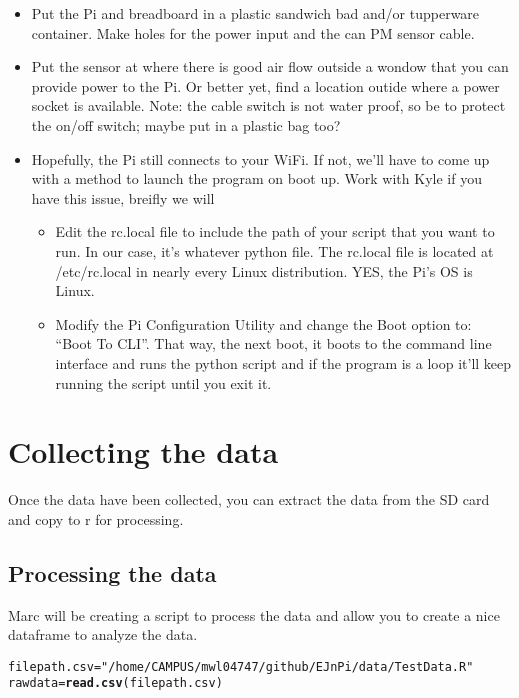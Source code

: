 \documentclass{article}\usepackage[]{graphicx}\usepackage[]{color}
\makeatletter
\newcommand{\hlstr}[1]{\textcolor[rgb]{0.192,0.494,0.8}{#1}}%
\newcommand{\hlstd}[1]{\textcolor[rgb]{0.345,0.345,0.345}{#1}}%
\newcommand{\hlkwb}[1]{\textcolor[rgb]{0.69,0.353,0.396}{#1}}%
\newcommand{\hlkwd}[1]{\textcolor[rgb]{0.737,0.353,0.396}{\textbf{#1}}}%
\newenvironment{kframe}{%
 \def\at@end@of@kframe{}%
 \ifinner\ifhmode%
  \def\at@end@of@kframe{\end{minipage}}%
  \begin{minipage}{\columnwidth}%
 \fi\fi%
 \def\FrameCommand##1{\hskip\@totalleftmargin \hskip-\fboxsep
 \colorbox{shadecolor}{##1}\hskip-\fboxsep
     \hskip-\linewidth \hskip-\@totalleftmargin \hskip\columnwidth}%
 \MakeFramed {\advance\hsize-\width
   \@totalleftmargin\z@ \linewidth\hsize
   \@setminipage}}%
 {\par\unskip\endMakeFramed%
 \at@end@of@kframe}
\newenvironment{knitrout}{}{} %
\makeatother
\begin{document}
\begin{itemize}
  \item Put the Pi and breadboard in a plastic sandwich bad and/or tupperware container. Make holes for the power input and the can PM sensor cable. 
  \item Put the sensor at where there is good air flow outside a wondow that you can provide power to the Pi. Or better yet, find a location outide where a power socket is available.  Note: the cable switch is not water proof, so be to protect the on/off switch; maybe put in a plastic bag too?
  \item Hopefully, the Pi still connects to your WiFi. If not, we'll have to come up with a method to launch the program on boot up. Work with Kyle if you have this issue, breifly we will 
  
\begin{itemize}
  \item Edit the rc.local file to include the path of your script that you want to run. In our case, it's whatever python file. The rc.local file is located at /etc/rc.local in nearly every Linux distribution. YES, the Pi's OS is Linux.
  \item Modify the Pi Configuration Utility and change the Boot option to: ``Boot To CLI''. That way, the next boot, it boots to the command line interface and runs the python script and if the program is a loop it'll keep running the script until you exit it.
  
\end{itemize}


\end{itemize}


\section{Collecting the data}

Once the data have been collected, you can extract the data from the SD card and copy to r for processing. 

\subsection{Processing the data}

Marc will be creating a script to process the data and allow you to create a nice dataframe to analyze the data.

\begin{knitrout}
\color{fgcolor}\begin{kframe}
\begin{alltt}
\hlstd{filepath.csv} \hlkwb{=} \hlstr{"/home/CAMPUS/mwl04747/github/EJnPi/data/TestData.R"}
\hlstd{rawdata} \hlkwb{=} \hlkwd{read.csv}\hlstd{(filepath.csv)}
\end{alltt}
\end{kframe}
\end{knitrout}
\end{document}

